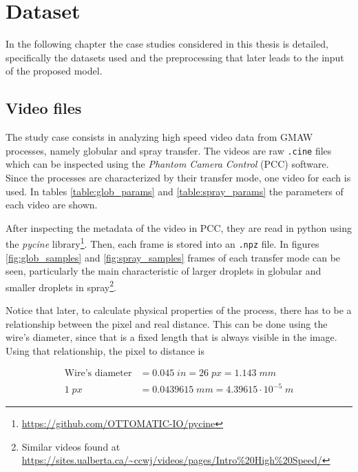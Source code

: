 \chapter{Dataset}\label{chap:dataset}
In the following chapter the case studies considered in this thesis is detailed, specifically the datasets used and the preprocessing that later leads to the input of the proposed model.

\section{Video files}
The study case consists in analyzing high speed video data from GMAW processes, namely globular and spray transfer. The videos are raw \texttt{.cine} files which can be inspected using the \textit{Phantom Camera Control} (PCC) software. Since the processes are characterized by their transfer mode, one video for each is used. In tables \ref{table:glob_params} and \ref{table:spray_params} the parameters of each video are shown. 

After inspecting the metadata of the video in PCC, they are read in python using the \textit{pycine} library\footnote{\url{https://github.com/OTTOMATIC-IO/pycine}}. Then, each frame is stored into an \texttt{.npz} file. In figures \ref{fig:glob_samples} and \ref{fig:spray_samples} frames of each transfer mode can be seen, particularly the main characteristic of larger droplets in globular and smaller droplets in spray\footnote{Similar videos found at \url{https://sites.ualberta.ca/~ccwj/videos/pages/Intro\%20High\%20Speed/}}.

Notice that later, to calculate physical properties of the process, there has to be a relationship between the pixel and real distance. This can be done using the wire's diameter, since that is a fixed length that is always visible in the image. Using that relationship, the pixel to distance is

\begin{align*}
    \text{Wire's diameter} &= 0.045\;in = 26\;px = 1.143\;mm\\
    1\;px &= 0.0439615\;mm =4.39615\cdot 10^{-5}\;m
\end{align*}

